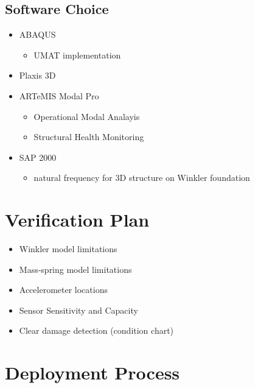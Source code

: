 \documentclass[
  letterpaper,
  DIV=11,
  numbers=noendperiod]{scrreprt}
\providecommand{\tightlist}{%
  \setlength{\itemsep}{0pt}\setlength{\parskip}{0pt}}\usepackage{longtable,booktabs,array}
\begin{document}
\hypertarget{software-choice}{%
\subsection{Software Choice}\label{software-choice}}

\begin{itemize}
\item
  ABAQUS

  \begin{itemize}
  \tightlist
  \item
    UMAT implementation
  \end{itemize}
\item
  Plaxis 3D
\item
  ARTeMIS Modal Pro

  \begin{itemize}
  \item
    Operational Modal Analayis
  \item
    Structural Health Monitoring
  \end{itemize}
\item
  SAP 2000

  \begin{itemize}
  \tightlist
  \item
    natural frequency for 3D structure on Winkler foundation
  \end{itemize}
\end{itemize}

\hypertarget{verification-plan}{%
\section{Verification Plan}\label{verification-plan}}

\begin{itemize}
\item
  Winkler model limitations
\item
  Mass-spring model limitations
\item
  Accelerometer locations
\item
  Sensor Sensitivity and Capacity
\item
  Clear damage detection (condition chart)
\end{itemize}

\hypertarget{deployment-process}{%
\section{Deployment Process}\label{deployment-process}}
\end{document}
